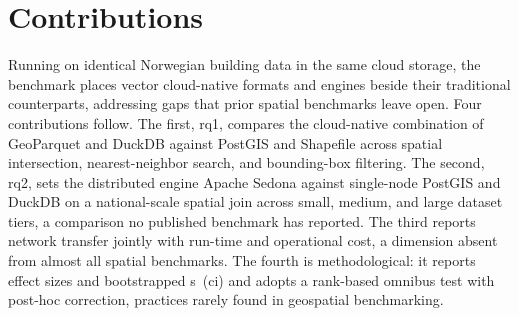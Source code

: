 \section{Contributions}
\label{introduction:contributions}
Running on identical Norwegian building data in the same cloud storage, the benchmark places vector cloud-native formats and engines beside their traditional counterparts, addressing gaps that prior spatial benchmarks leave open. Four contributions follow. The first, \acrshort{rq}1, compares the cloud-native combination of GeoParquet and DuckDB against PostGIS and Shapefile across spatial intersection, nearest-neighbor search, and bounding-box filtering. The second, \acrshort{rq}2, sets the distributed engine Apache Sedona against single-node PostGIS and DuckDB on a national-scale spatial join across small, medium, and large dataset tiers, a comparison no published benchmark has reported. The third reports network transfer jointly with run-time and operational cost, a dimension absent from almost all spatial benchmarks. The fourth is methodological: it reports effect sizes and bootstrapped s~(\acrshort{ci}) and adopts a rank-based omnibus test with post-hoc correction, practices rarely found in geospatial benchmarking.